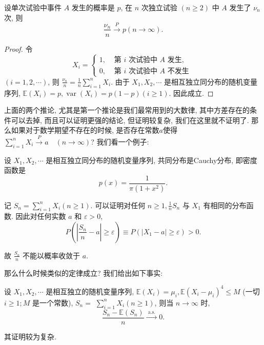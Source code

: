 \begin{corollary}
    设单次试验中事件 $A$ 发生的概率是 $p$, 在 $n$ 次独立试验 $(n \geq 2)$ 中 $A$ 发生了 $\nu_n$ 次, 则
$$
\frac{\nu_n}{n} \stackrel{P}{\longrightarrow} p(n \rightarrow \infty) .
$$
\end{corollary}

\begin{proof}令
$$
X_i= \begin{cases}1, & \text { 第 } i \text { 次试验中 } A \text { 发生, } \\ 0, & \text { 第 } i \text { 次试验中 } A \text { 不发生 }\end{cases}
$$
$(i=1,2, \cdots)$, 则 $\frac{\nu_n}{n}=\frac{1}{n} \sum_{i=1}^n X_i$. 由于 $X_1, X_2, \cdots$ 是相互独立同分布的随机变量序列, $\mathbb{E}\left(X_i\right)=p, \operatorname{var}\left(X_i\right)=p(1-p)(i \geq 1)$. 因此成立.
\end{proof}

上面的两个推论, 尤其是第一个推论是我们最常用到的大数律, 其中方差存在的条件可以去掉, 而且可以证明更强的结论, 但证明较复杂, 我们在这里就不证明了. 那么如果对于数学期望不存在的时候, 是否存在常数$a$使得$\sum_{i=1}^n X_i \stackrel{P}{\longrightarrow} a \quad(n \rightarrow \infty)$? 我们看一个例子: 

\begin{example}
    设 $X_1, X_2, \cdots$ 是相互独立同分布的随机变量序列, 共同分布是Cauchy分布, 即密度函数是
$$
p(x)=\frac{1}{\pi\left(1+x^2\right)} .
$$

记 $S_n=\sum_{i=1}^n X_i(n \geq 1)$. 可以证明对任何 $n \geq 1, \frac{1}{n} S_n$ 与 $X_1$ 有相同的分布函数. 因此对任何实数 $a$ 和 $\varepsilon>0$,
$$
P\left(\left|\frac{S_n}{n}-a\right| \geq \varepsilon\right) \equiv P\left(\left|X_1-a\right| \geq \varepsilon\right)>0 .
$$

故 $\frac{S_n}{n}$ 不能以概率收敛于 $a$.
\end{example}

那么什么时候类似的定律成立? 我们给出如下事实: 

\begin{theorem}
      设 $X_1, X_2, \cdots$ 是相互独立的随机变量序列, $\mathbb{E}\left(X_i\right)=\mu_i, \mathbb{E}\left(X_i-\mu_i\right)^4 \leq M$ (一切 $i \geq 1 ; M$ 是一个常数), $S_n=$ $\sum_{i=1}^n X_i(n \geq 1)$, 则当 $n \rightarrow \infty$ 时,
$$
\frac{S_n-\mathbb{E}\left(S_n\right)}{n} \stackrel{\text { a.s. }}{\longrightarrow} 0 .
$$
\end{theorem}

其证明较为复杂. 

